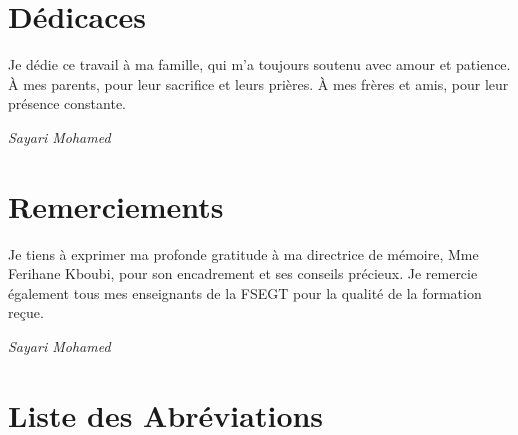 \documentclass[12pt,a4paper,oneside]{report}
\begin{document}
\chapter*{Dédicaces}
\thispagestyle{plain}

Je dédie ce travail à ma famille, qui m'a toujours soutenu avec amour et patience. À mes parents, pour leur sacrifice et leurs prières. À mes frères et amis, pour leur présence constante. 

\bigskip
\begin{flushright}
\textit{Sayari Mohamed}
\end{flushright}

\chapter*{Remerciements}
\thispagestyle{plain}

Je tiens à exprimer ma profonde gratitude à ma directrice de mémoire, Mme Ferihane Kboubi, pour son encadrement et ses conseils précieux. Je remercie également tous mes enseignants de la FSEGT pour la qualité de la formation reçue.

\bigskip
\begin{flushright}
\textit{Sayari Mohamed}
\end{flushright}

\tableofcontents
\listoffigures
\listoftables

\chapter*{Liste des Abréviations}
\thispagestyle{plain}
\end{document}
